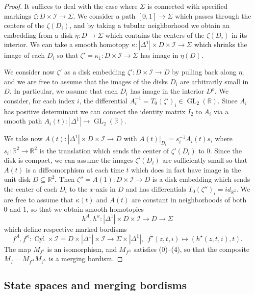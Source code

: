 \documentclass[reqno]{amsart}
\theoremstyle{definition}
\newcommand{\mbb}[1]{\mathbb{#1}}
\newcommand{\mcl}[1]{\mathcal{#1}}
\newcommand{\opn}[1]{\operatorname{#1}}
\renewcommand{\1}{\mathbf{1}}
\begin{document}
\begin{proof}
It suffices to deal with the case where $\Sigma$ is connected with specified markings $\zeta:D\times\mcl{I}\to \Sigma$. We consider a path $[0,1]\to \Sigma$ which passes through the centers of the $\zeta(D_i)$, and by taking a tubular neighborhood we obtain an embedding from a disk $\eta:D\to \Sigma$ which contains the centers of the $\zeta(D_i)$ in its interior.  We can take a smooth homotopy $\kappa:|\Delta^1|\times D\times \mcl{I}\to \Sigma$ which shrinks the image of each $D_i$ so that $\zeta'=\kappa_1:D\times \mcl{I}\to \Sigma$ has image in $\eta(D)$.
\par

We consider now $\zeta'$ as a disk embedding $\zeta':D\times \mcl{I}\to D$ by pulling back along $\eta$, and we are free to assume that the images of the disks $D_i$ are arbitrarily small in $D$.  In particular, we assume that each $D_i$ has image in the interior $D^o$.  We consider, for each index $i$, the differential $A_i^{-1}=T_0(\zeta')_i\in \opn{GL}_2(\mbb{R})$. Since $A_i$ has positive determinant we can connect the identity matrix $I_2$ to $A_i$ via a smooth path $A_i(t):|\Delta^1|\to \opn{GL}_2(\mbb{R})$.
\par

We take now $A(t):|\Delta^1|\times D\times \mcl{I}\to D$ with $A(t)|_{D_i}=s_i^{-1}A_i(t)s_i$ where $s_i:\mbb{R}^2\to \mbb{R}^2$ is the translation which sends the center of $\zeta'(D_i)$ to $0$.  Since the disk is compact, we can assume the images $\zeta'(D_i)$ are sufficiently small so that $A(t)$ is a diffeomorphism at each time $t$ which does in fact have image in the unit disk $D\subseteq \mbb{R}^2$.  Then $\zeta''=A(1):D\times \mcl{I}\to D$ is a disk embedding which sends the center of each $D_i$ to the $x$-axis in $D$ and has differentials $T_0(\zeta'')_i=id_{\mbb{R}^2}$.  We are free to assume that $\kappa(t)$ and $A(t)$ are constant in neighborhoods of both $0$ and $1$, so that we obtain smooth homotopies
\[
h^A,h^{\kappa}:|\Delta^1|\times D\times \mcl{I}\to D\to \Sigma
\]
which define respective marked bordisms
\[
f^A,f^{\kappa}:\opn{Cyl}\times \mcl{I}=D\times |\Delta^1|\times\mcl{I}\to \Sigma\times|\Delta^1|,\ \ f^{\star}(z,t,i)\mapsto (h^{\star}(z,t,i),t).
\]
The map $M_{f^{\kappa}}$ is an isomorphism, and $M_{f^A}$ satisfies (0)--(4), so that the composite $M_f=M_{f^A}M_{f^{\kappa}}$ is a merging bordism.
\end{proof}

\subsection{State spaces and merging bordisms}
\end{document}
